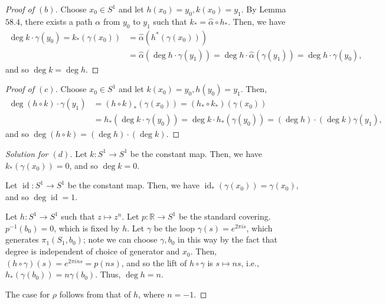 \documentclass[12pt]{article}
\theoremstyle{remark}
\DeclareMathOperator{\id}{id}
\begin{document}
\begin{proof}[Proof of $(b)$]
  Choose $x_0 \in S^1$ and let $h(x_0) = y_0, k(x_0) = y_1$. By Lemma $58.4$, there exists a path $\alpha$ from $y_0$ to $y_1$ such that $k_* = \hat{\alpha} \circ h_*$. Then, we have
  \begin{align*}
    \deg k \cdot \gamma(y_0) = k_*(\gamma(x_0)) &= \hat{\alpha}(h^*(\gamma(x_0)))\\
    &= \hat{\alpha}(\deg h\cdot\gamma(y_1)) = \deg h\cdot\hat{\alpha}(\gamma(y_1)) = \deg h\cdot\gamma(y_0),
  \end{align*}
  and so $\deg k = \deg h$.
\end{proof}
\begin{proof}[Proof of $(c)$]
  Choose $x_0 \in S^1$ and let $k(x_0) = y_0, h(y_0) = y_1$. Then,
  \begin{align*}
    \deg (h \circ k) \cdot \gamma(y_1) &= (h \circ k)_*(\gamma(x_0)) = (h_* \circ k_*)(\gamma(x_0))\\
    &= h_*(\deg k\cdot\gamma(y_0)) = \deg k\cdot h_*(\gamma(y_0)) = (\deg h)\cdot(\deg k)\gamma(y_1),
  \end{align*}
  and so $\deg(h \circ k) = (\deg h)\cdot(\deg k)$.
\end{proof}
\begin{proof}[Solution for $(d)$]
  Let $k\colon S^1 \to S^1$ be the constant map. Then, we have $k_*(\gamma(x_0)) = 0$, and so $\deg k = 0$.
  \par Let $\id\colon S^1 \to S^1$ be the constant map. Then, we have $\id_*(\gamma(x_0)) = \gamma(x_0)$, and so $\deg \id = 1$.
  \par Let $h\colon S^1 \to S^1$ such that $z \mapsto z^n$. Let $p\colon \mathbb{R} \to S^1$ be the standard covering. $p^{-1}(b_0) = 0$, which is fixed by $h$. Let $\gamma$ be the loop $\gamma(s) = e^{2\pi is}$, which generates $\pi_1(S_1,b_0)$; note we can choose $\gamma,b_0$ in this way by the fact that degree is independent of choice of generator and $x_0$. Then, $(h \circ \gamma)(s) = e^{2\pi ins} = p(ns)$, and so the lift of $h \circ \gamma$ is $s \mapsto ns$, i.e., $h_*(\gamma(b_0)) = n\gamma(b_0)$. Thus, $\deg h = n$.
  \par The case for $\rho$ follows from that of $h$, where $n = -1$.
\end{proof}
\end{document}
